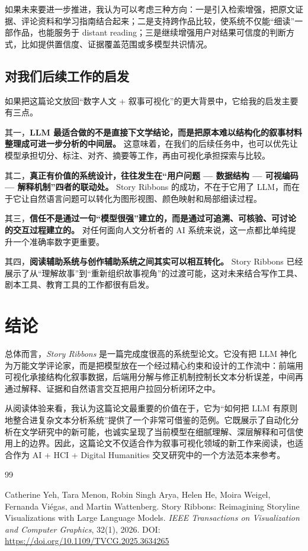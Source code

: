 \documentclass[a4paper,12pt,UTF8]{article}
\begin{document}
如果未来要进一步推进，我认为可以考虑三种方向：一是引入检索增强，把原文证据、评论资料和学习指南结合起来；二是支持跨作品比较，使系统不仅能“细读”一部作品，也能服务于 distant reading；三是继续增强用户对结果可信度的判断方式，比如提供置信度、证据覆盖范围或多模型共识情况。

\subsection{对我们后续工作的启发}
如果把这篇论文放回“数字人文 + 叙事可视化”的更大背景中，它给我的启发主要有三点。

其一，\textbf{LLM 最适合做的不是直接下文学结论，而是把原本难以结构化的叙事材料整理成可进一步分析的中间层。} 这意味着，在我们的后续任务中，也可以优先让模型承担切分、标注、对齐、摘要等工作，再由可视化承担探索与比较。

其二，\textbf{真正有价值的系统设计，往往发生在“用户问题 --- 数据结构 --- 可视编码 --- 解释机制”四者的联动处。} Story Ribbons 的成功，不在于它用了 LLM，而在于它让自然语言问题可以转化为图形视图、颜色映射和局部细读过程。

其三，\textbf{信任不是通过一句“模型很强”建立的，而是通过可追溯、可核验、可讨论的交互过程建立的。} 对任何面向人文分析者的 AI 系统来说，这一点都比单纯提升一个准确率数字更重要。

其四，\textbf{阅读辅助系统与创作辅助系统之间其实可以相互转化。} Story Ribbons 已经展示了从“理解故事”到“重新组织故事视角”的过渡可能，这对未来结合写作工具、剧本工具、教育工具的工作都很有启发。

\section{结论}
总体而言，\textit{Story Ribbons} 是一篇完成度很高的系统型论文。它没有把 LLM 神化为万能文学评论家，而是把模型放在一个经过精心约束和设计的工作流中：前端用可视化承接结构化叙事数据，后端用分解与修正机制控制长文本分析误差，中间再通过解释、证据和自然语言交互把用户拉回分析闭环之中。

从阅读体验来看，我认为这篇论文最重要的价值在于，它为“如何把 LLM 有原则地整合进复杂文本分析系统”提供了一个非常可借鉴的范例。它既展示了自动化分析在文学研究中的新可能，也诚实呈现了当前模型在细腻理解、深层解释和可信使用上的边界。因此，这篇论文不仅适合作为叙事可视化领域的新工作来阅读，也适合作为 AI + HCI + Digital Humanities 交叉研究中的一个方法范本来参考。
\begin{thebibliography}{99}

Catherine Yeh, Tara Menon, Robin Singh Arya, Helen He, Moira Weigel, Fernanda Vi\'egas, and Martin Wattenberg.
\newblock Story Ribbons: Reimagining Storyline Visualizations with Large Language Models.
\newblock \textit{IEEE Transactions on Visualization and Computer Graphics}, 32(1), 2026.
\newblock DOI: \url{https://doi.org/10.1109/TVCG.2025.3634265}

\end{thebibliography}
\end{document}
